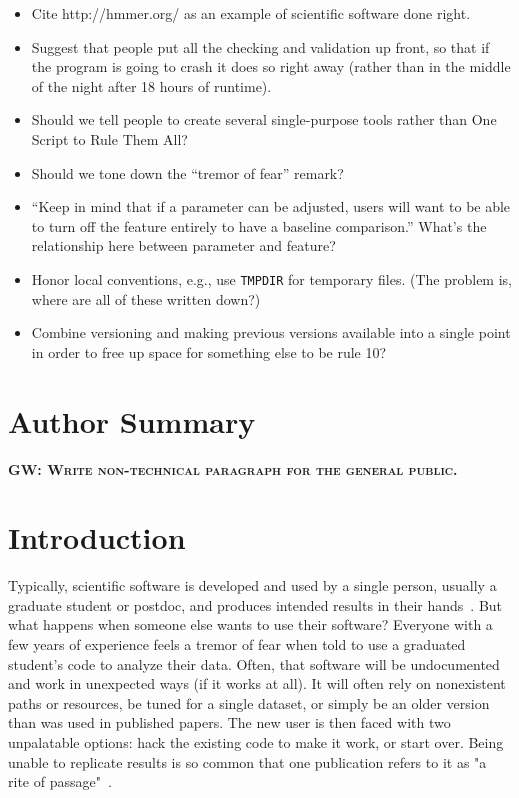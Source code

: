 \documentclass[10pt,letterpaper]{article}
\newcommand{\fixme}[2]{\textsc{\textbf{{#1}: {#2}}}}
\begin{document}
\begin{itemize}
\item
Cite http://hmmer.org/ as an example of scientific software done right.

\item
Suggest that people put all the checking and validation up front,
so that if the program is going to crash it does so right away
(rather than in the middle of the night after 18 hours of runtime).

\item
Should we tell people to create several single-purpose tools
rather than One Script to Rule Them All?

\item
Should we tone down the ``tremor of fear'' remark?

\item
``Keep in mind that if a parameter can be adjusted,
users will want to be able to turn off the feature entirely to have a baseline comparison.''
What's the relationship here between parameter and feature?

\item
Honor local conventions,
e.g.,
use \texttt{TMPDIR} for temporary files.
(The problem is,
where are all of these written down?)

\item
Combine versioning and making previous versions available into a single point
in order to free up space for something else to be rule 10?

\end{itemize}

\section*{Author Summary}

\fixme{GW}{Write non-technical paragraph for the general public.}

\linenumbers

\section*{Introduction}

Typically, scientific software is developed and used by a single person,
usually a graduate student or postdoc, and produces intended results in their
hands~\cite{prins2015}. 
But what happens
when someone else wants to use their software? Everyone with
a few years of experience feels a tremor of fear when told to use
a graduated student's code to analyze their data.
Often, that software will be undocumented and work in unexpected
ways (if it works at all).  It will often rely on nonexistent paths or resources,
be tuned for a single dataset,
or simply be an older version than was used in published papers.
The new user is then faced with two unpalatable options:
hack the existing code to make it work, or start over. Being unable to
replicate results is so common that one publication refers to it as "a rite of
passage"~\cite{baker2016}. 
\end{document}

